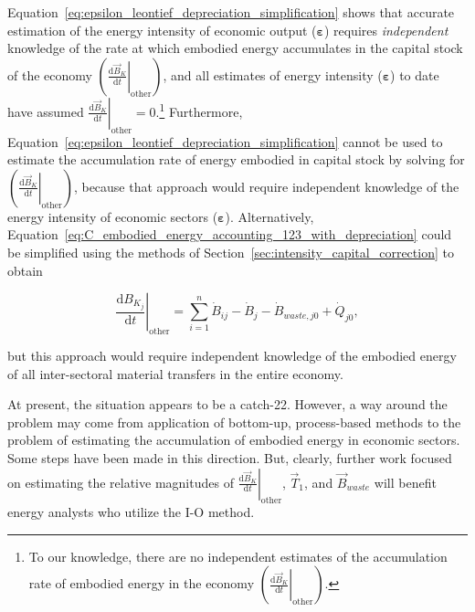 Equation~\ref{eq:epsilon_leontief_depreciation_simplification} shows that 
accurate estimation of the energy intensity of economic output ($\bm{\varepsilon}$)
requires \emph{independent} knowledge of the rate 
at which embodied energy accumulates in the capital stock of the economy 
$\left( \left. \frac{\mathrm{d}\vec{B}_{K}}{\mathrm{d}t} \right|_{\mathrm{other}} \right)$,
and all estimates of energy intensity ($\bm{\varepsilon}$) to date have assumed 
$\left. \frac{\mathrm{d}\vec{B}_{K}}{\mathrm{d}t} \right|_{\mathrm{other}} = 0$.\footnote{To 
our knowledge, there are no independent estimates 
of the accumulation rate of embodied energy in the economy
$\left( \left. \frac{\mathrm{d}\vec{B}_{K}}{\mathrm{d}t} \right|_{\mathrm{other}} \right)$.}
Furthermore, Equation~\ref{eq:epsilon_leontief_depreciation_simplification} 
cannot be used to estimate the accumulation rate of energy embodied in 
capital stock by solving for 
$\left( \left. \frac{\mathrm{d}\vec{B}_{K}}{\mathrm{d}t} \right|_{\mathrm{other}} \right)$,
because that approach would require independent knowledge
of the energy intensity of economic sectors ($\bm{\varepsilon}$).
Alternatively, Equation~\ref{eq:C_embodied_energy_accounting_123_with_depreciation} 
could be simplified using the 
methods of Section~\ref{sec:intensity_capital_correction} to obtain

\begin{equation} \label{eq:C_embodied_energy_accounting_123_with_depreciation_simplified}
	\left. \frac{\mathrm{d}B_{K_{j}}}{\mathrm{d}t} \right|_{\mathrm{other}}
	= \sum\limits_{i=1}^n\dot{B}_{ij} 
	- \dot{B}_{j}
	- \dot{B}_{waste,j0}
	+ \dot{Q}_{j0},
\end{equation}

\noindent{}but this approach would require independent knowledge of the 
embodied energy of all inter-sectoral material transfers in the entire economy.

At present, the situation appears to be a catch-22. 
However, a way around the problem may come from application
of bottom-up, process-based methods to the problem 
of estimating the accumulation of embodied energy 
in economic sectors. 
Some steps have been made in this direction.\cite{brandt2013calculating}
But, clearly, further work focused on estimating the relative magnitudes of 
$\left. \frac{\mathrm{d}\vec{B}_{K}}{\mathrm{d}t} \right|_{\mathrm{other}}$,
$\vec{T}_{1}$, and $\vec{B}_{waste}$ 
will benefit energy analysts who utilize the I-O method.


